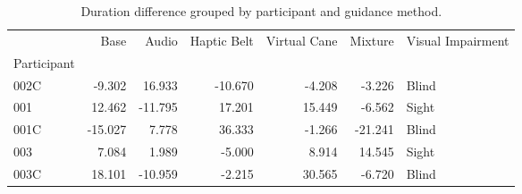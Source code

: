 
\begin{table}[!htb]
\centering
\caption{Duration difference grouped by participant and guidance method.}
\label{tab:duracao_var}
\begin{tabular}{lrrrrrl}
\toprule
{} &    Base &   Audio &  Haptic Belt &  Virtual Cane &  Mixture & Visual Impairment \\
Participant &         &         &              &               &          &                   \\
\midrule
002C        &  -9.302 &  16.933 &      -10.670 &        -4.208 &   -3.226 &             Blind \\
001         &  12.462 & -11.795 &       17.201 &        15.449 &   -6.562 &             Sight \\
001C        & -15.027 &   7.778 &       36.333 &        -1.266 &  -21.241 &             Blind \\
003         &   7.084 &   1.989 &       -5.000 &         8.914 &   14.545 &             Sight \\
003C        &  18.101 & -10.959 &       -2.215 &        30.565 &   -6.720 &             Blind \\
\bottomrule
\end{tabular}
\end{table}

